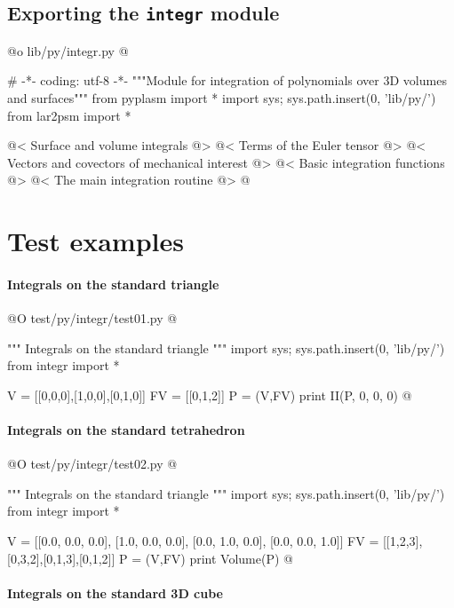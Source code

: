 \documentclass[11pt,oneside]{article}	%
\begin{document}
\subsection{Exporting the \texttt{integr} module}

@o lib/py/integr.py 
@{# -*- coding: utf-8 -*-
"""Module for integration of polynomials over 3D volumes and surfaces"""
from pyplasm import *
import sys; sys.path.insert(0, 'lib/py/')
from lar2psm import *

@< Surface and volume integrals @>
@< Terms of the Euler tensor @>
@< Vectors and covectors of mechanical interest @>
@< Basic integration functions @>
@< The main integration routine @>
@}



\section{Test examples}

\paragraph{Integrals on the standard triangle}
@O test/py/integr/test01.py
@{""" Integrals on the standard triangle """
import sys; sys.path.insert(0, 'lib/py/')
from integr import *

V = [[0,0,0],[1,0,0],[0,1,0]]
FV = [[0,1,2]]
P = (V,FV)
print II(P, 0, 0, 0)
@}


\paragraph{Integrals on the standard tetrahedron}
@O test/py/integr/test02.py
@{""" Integrals on the standard triangle """
import sys; sys.path.insert(0, 'lib/py/')
from integr import *

V = [[0.0, 0.0, 0.0], [1.0, 0.0, 0.0], [0.0, 1.0, 0.0], [0.0, 0.0, 1.0]]
FV = [[1,2,3],[0,3,2],[0,1,3],[0,1,2]]
P = (V,FV)
print Volume(P)
@}


\paragraph{Integrals on the standard 3D cube}
\end{document}
